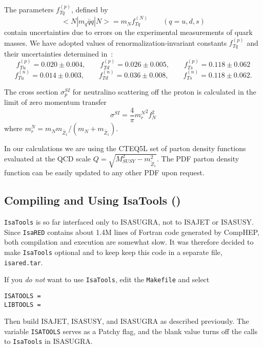 The parameters  $f_{Tq}^{(p)}$, defined by
\begin{equation}
<N|m_q \bar{q} q|N> = m_N f_{Tq}^{(N)} \qquad (q=u,d,s)
\end{equation}
contain uncertainties due to errors on the experimental measurements of quark masses.
We have adopted values of renormalization-invariant  constants $f_{Tq}^{(p)}$
and their uncertainties
determined in~\cite{dirdet-ellis}:
\begin{equation}
f_{Tu}^{(p)} = 0.020 \pm 0.004, \qquad f_{Td}^{(p)} = 0.026 \pm 0.005,
\qquad f_{Ts}^{(p)} = 0.118 \pm 0.062
\end{equation}
\begin{equation}
f_{Tu}^{(n)} = 0.014 \pm 0.003, \qquad f_{Td}^{(n)} = 0.036 \pm 0.008,
\qquad f_{Ts}^{(n)} = 0.118 \pm 0.062.
\end{equation}

The cross section $\sigma_p^{SI}$
for neutralino scattering off the proton is calculated in the limit of zero momentum transfer
\begin{equation}
\sigma^{SI}=\frac{4}{\pi}{m_r^N}^2 f_N^2
\end{equation}
where $m_r^N=m_N m_{\tilde{Z_1}}/(m_N+m_{\tilde{Z_1}})$.

In our calculations we are using the CTEQ5L set of parton density 
functions~\cite{CTEQ5}
evaluated at the QCD scale $Q=\sqrt{M_{SUSY}^2-m_{\tilde{Z}_1}^2}$.
The PDF  parton density 
function can be easily updated to any other PDF upon request.

\subsection{Compiling and Using IsaTools ()}

\verb|IsaTools| is so far interfaced only to ISASUGRA, not to ISAJET or
ISASUSY. Since \verb|IsaRED| contains about 1.4M lines of Fortran code
generated by CompHEP, both compilation and execution are somewhat slow. 
It was therefore decided to make \verb|IsaTools| optional and to keep
keep this code in a separate file, \verb|isared.tar|.

If you {\it do not} want to use \verb|IsaTools|, edit the
\verb|Makefile| and select
\begin{verbatim}
ISATOOLS =
LIBTOOLS =
\end{verbatim}
Then build ISAJET, ISASUSY, and ISASUGRA as described previously. The
variable \verb|ISATOOLS| serves as a Patchy flag, and the blank value
turns off the calls to \verb|IsaTools| in ISASUGRA.

